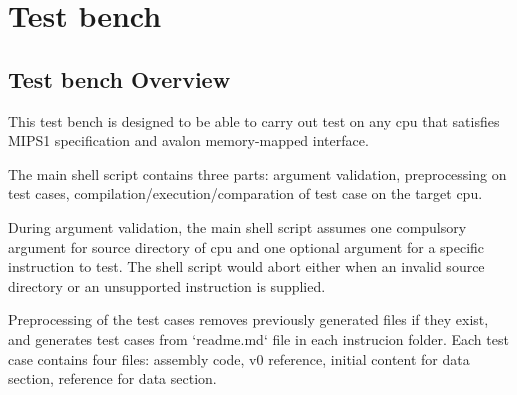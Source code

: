 \section{Test bench}

\subsection{Test bench Overview}

This test bench is designed to be able to carry out test on any cpu that satisfies MIPS1 specification and avalon memory-mapped interface. 

The main shell script contains three parts: argument validation, preprocessing on test cases, compilation/execution/comparation of test case on the target cpu.

During argument validation, the main shell script assumes one compulsory argument for source directory of cpu and one optional argument for a specific instruction to test. The shell script would abort either when an invalid source directory or an unsupported instruction is supplied.

Preprocessing of the test cases removes previously generated files if they exist, and generates test cases from `readme.md` file in each instrucion folder. Each test case contains four files: assembly code, v0 reference, initial content for data section, reference for data section.

